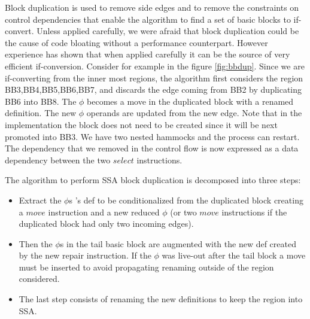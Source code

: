 Block duplication is used to remove side edges and to remove the constraints on control dependencies that enable the algorithm to find a set of basic blocks to if-convert. Unless applied carefully, we were afraid that block duplication could be the cause of code bloating without a performance counterpart. However experience has shown that when applied carefully it can be the source of very efficient if-conversion. Consider for example in the figure \ref{fig:bbdup}. Since we are if-converting from the inner most regions, the algorithm first considers the region {BB3,BB4,BB5,BB6,BB7}, and discards the edge coming from BB2 by duplicating BB6 into BB8. The $\phi$ becomes a move in the duplicated block with a renamed definition. The new $\phi$ operands are updated from the new edge. Note that in the implementation the block does not need to be created since it will be next promoted into BB3. We have two nested hammocks and the process can restart. The dependency that we removed in the control flow is now expressed as a data dependency between the two $select$ instructions.

The algorithm to perform SSA block duplication is decomposed into three steps: 
\begin{itemize}
\item Extract the $\phi$s 's def to be conditionalized from the duplicated block creating a $move$ instruction and a new reduced $\phi$ (or two $move$ instructions if the duplicated block had only two incoming edges).
\item Then the $\phi$s in the tail basic block are augmented with the new def created by the new repair instruction. If the $\phi$ was live-out after the tail block a move must be inserted to avoid propagating renaming outside of the region considered. 
\item The last step consists of renaming the new definitions to keep the region into SSA.
\end{itemize}

